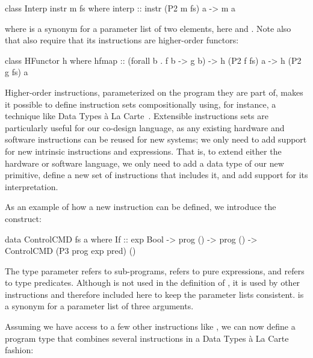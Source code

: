 \documentclass[../paper.tex]{subfiles}
\begin{document}
\begin{code}
class Interp instr m fs where
  interp :: instr (P2 m fs) a -> m a
\end{code}

\noindent where  is a synonym for a parameter list of two elements, here  and . Note also that  also require that its instructions are higher-order functors:

\begin{code}
class HFunctor h where
  hfmap :: (forall b . f b -> g b) -> h (P2 f fs) a -> h (P2 g fs) a
\end{code}

Higher-order instructions, parameterized on the program they are part of, makes it possible to define instruction sets compositionally using, for instance, a technique like Data Types \`{a} La Carte~\cite{DTC}. Extensible instructions sets are particularly useful for our co-design language, as any existing hardware and software instructions can be reused for new systems; we only need to add support for new intrinsic instructions and expressions. That is, to extend either the hardware or software language, we only need to add a data type of our new primitive, define a new set of instructions that includes it, and add support for its interpretation. 


As an example of how a new instruction can be defined, we introduce the  construct:

\begin{code}
data ControlCMD fs a where
  If :: exp Bool -> prog () -> prog () -> ControlCMD (P3 prog exp pred) ()
\end{code}

\noindent The type parameter  refers to sub-programs,  refers to pure expressions, and  refers to type predicates. Although  is not used in the definition of , it is used by other instructions and therefore included here to keep the parameter lists consistent.  is a synonym for a parameter list of three arguments.

Assuming we have access to a few other instructions like , we can now define a program type that combines several instructions in a Data Types \`{a} La Carte fashion:
\end{document}
